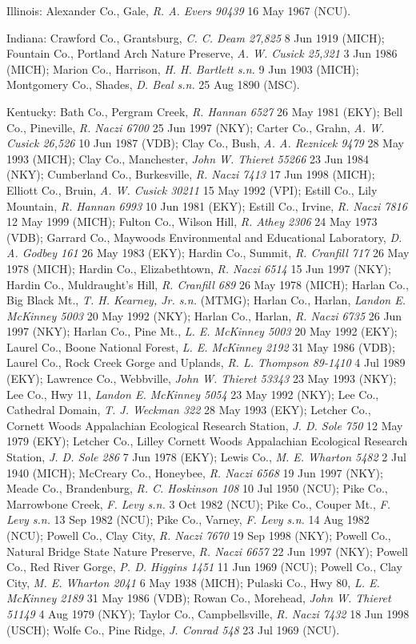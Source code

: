 \documentclass{article}
\begin{document}
Illinois:
Alexander Co., Gale, \textit{R. A. Evers 90439} 16 May 1967 (NCU).

Indiana:
Crawford Co., Grantsburg, \textit{C. C. Deam 27,825} 8 Jun 1919 (MICH);
Fountain Co., Portland Arch Nature Preserve, \textit{A. W. Cusick 25,321} 3 Jun 1986 (MICH);
Marion Co.,  Harrison, \textit{H. H. Bartlett s.n.} 9 Jun 1903 (MICH);
Montgomery Co., Shades, \textit{D. Beal s.n.} 25 Aug 1890 (MSC).

Kentucky:
Bath Co., Pergram Creek, \textit{R. Hannan 6527} 26 May 1981 (EKY);
Bell Co., Pineville, \textit{R. Naczi 6700} 25 Jun 1997 (NKY);
Carter Co.,  Grahn, \textit{A. W. Cusick 26,526} 10 Jun 1987 (VDB);
Clay Co., Bush, \textit{A. A. Reznicek 9479} 28 May 1993 (MICH);
Clay Co., Manchester, \textit{John W. Thieret 55266} 23 Jun 1984 (NKY);
Cumberland Co., Burkesville, \textit{R. Naczi 7413} 17 Jun 1998 (MICH);
Elliott Co., Bruin, \textit{A. W. Cusick 30211} 15 May 1992 (VPI);
Estill Co., Lily Mountain, \textit{R. Hannan 6993} 10 Jun 1981 (EKY);
Estill Co., Irvine, \textit{R. Naczi 7816} 12 May 1999 (MICH);
Fulton Co., Wilson Hill, \textit{R. Athey 2306} 24 May 1973 (VDB);
Garrard Co.,  Maywoods Environmental and Educational Laboratory, \textit{D. A. Godbey 161} 26 May 1983 (EKY);
Hardin Co.,  Summit, \textit{R. Cranfill 717} 26 May 1978 (MICH);
Hardin Co., Elizabethtown, \textit{R. Naczi 6514} 15 Jun 1997 (NKY);
Hardin Co., Muldraught's Hill, \textit{R. Cranfill 689} 26 May 1978 (MICH);
Harlan Co., Big Black Mt., \textit{T. H. Kearney, Jr. s.n.}  (MTMG);
Harlan Co., Harlan, \textit{Landon E. McKinney 5003} 20 May 1992 (NKY);
Harlan Co., Harlan, \textit{R. Naczi 6735} 26 Jun 1997 (NKY);
Harlan Co., Pine Mt., \textit{L. E. McKinney 5003} 20 May 1992 (EKY);
Laurel Co., Boone National Forest, \textit{L. E. McKinney 2192} 31 May 1986 (VDB);
Laurel Co., Rock Creek Gorge and Uplands, \textit{R. L. Thompson 89-1410} 4 Jul 1989 (EKY);
Lawrence Co., Webbville, \textit{John W. Thieret 53343} 23 May 1993 (NKY);
Lee Co., Hwy 11, \textit{Landon E. McKinney 5054} 23 May 1992 (NKY);
Lee Co., Cathedral Domain, \textit{T. J. Weckman 322} 28 May 1993 (EKY);
Letcher Co., Cornett Woods Appalachian Ecological Research Station, \textit{J. D. Sole 750} 12 May 1979 (EKY);
Letcher Co., Lilley Cornett Woods Appalachian Ecological Research Station, \textit{J. D. Sole 286} 7 Jun 1978 (EKY);
Lewis Co., \textit{M. E. Wharton 5482} 2 Jul 1940 (MICH);
McCreary Co., Honeybee, \textit{R. Naczi 6568} 19 Jun 1997 (NKY);
Meade Co., Brandenburg, \textit{R. C. Hoskinson 108} 10 Jul 1950 (NCU);
Pike Co., Marrowbone Creek, \textit{F. Levy s.n.} 3 Oct 1982 (NCU);
Pike Co., Couper Mt., \textit{F. Levy s.n.} 13 Sep 1982 (NCU);
Pike Co., Varney, \textit{F. Levy s.n.} 14 Aug 1982 (NCU);
Powell Co., Clay City, \textit{R. Naczi 7670} 19 Sep 1998 (NKY);
Powell Co., Natural Bridge State Nature Preserve, \textit{R. Naczi 6657} 22 Jun 1997 (NKY);
Powell Co., Red River Gorge, \textit{P. D. Higgins 1451} 11 Jun 1969 (NCU);
Powell Co., Clay City, \textit{M. E. Wharton 2041} 6 May 1938 (MICH);
Pulaski Co., Hwy 80, \textit{L. E. McKinney 2189} 31 May 1986 (VDB);
Rowan Co., Morehead, \textit{John W. Thieret 51149} 4 Aug 1979 (NKY);
Taylor Co., Campbellsville, \textit{R. Naczi 7432} 18 Jun 1998 (USCH);
Wolfe Co., Pine Ridge, \textit{J. Conrad 548} 23 Jul 1969 (NCU).
\end{document}
